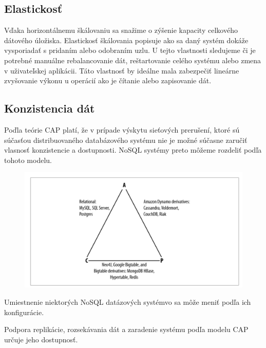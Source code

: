 \documentclass[11pt,twoside,a4paper]{book}
\begin{document}
\subsection{Elastickosť}
Vďaka horizontálnemu škálovaniu sa snažime o zýšenie kapacity celkového dátového úložiska. Elastickosť škálovania popisuje ako sa daný systém dokáže vysporiadať s pridaním alebo odobraním uzlu. U tejto vlastnosti sledujeme či je potrebné manuálne rebalancovanie dát, reštartovanie celého systému alebo zmena v uživateľskej aplikácii. Táto vlastnosť by ideálne mala zabezpečiť lineárne zvyšovanie výkonu u operácií ako je čítanie alebo zapisovanie dát.


\subsection{Konzistencia dát}
Poďla teórie CAP platí, že v prípade výskytu sieťových prerušení, ktoré sú súčasťou distribuovaného databázového systému nie je možné súčasne zaručiť vlasnosť konzistencie a dostupnosti. NoSQL systémy preto môžeme rozdeliť podľa tohoto modelu.

\begin{figure}[h]
 \centering
 \includegraphics[width=16cm]{./figures/capDatabases.png}
 \caption{}
 \label{fig:scalling}
\end{figure}

Umiestnenie niektorých NoSQL datázových systémvo sa môže meniť podľa ich konfigurácie. 

Podpora replikácie, rozsekávania dát a zaradenie systému podľa modelu CAP určuje jeho dostupnosť.
\end{document}

